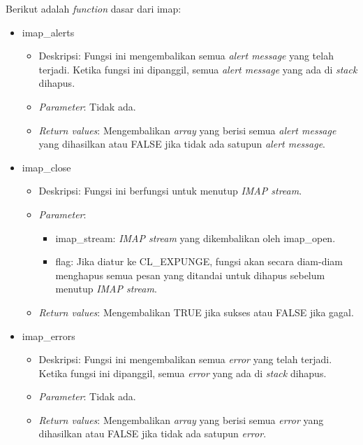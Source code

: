 Berikut adalah \textit{function} dasar dari imap:
\begin{itemize}
\item imap\_alerts
\begin{itemize}
\item Deskripsi: Fungsi ini mengembalikan semua \textit{alert message} yang telah terjadi. Ketika fungsi ini dipanggil, semua \textit{alert message} yang ada di \textit{stack} dihapus.
\item \textit{Parameter}: Tidak ada.
\item \textit{Return values}: Mengembalikan \textit{array} yang berisi semua \textit{alert message} yang dihasilkan atau FALSE jika tidak ada satupun \textit{alert message}.
\end{itemize}
 
\item imap\_close
\begin{itemize}
\item Deskripsi: Fungsi ini berfungsi untuk menutup \textit{IMAP stream}.
\item \textit{Parameter}:
\begin{itemize}
\item imap\_stream: \textit{IMAP stream} yang dikembalikan oleh imap\_open.
\item flag: Jika diatur ke CL\_EXPUNGE, fungsi akan secara diam-diam menghapus semua pesan yang ditandai untuk dihapus sebelum menutup \textit{IMAP stream}.
\end{itemize}
\item \textit{Return values}: Mengembalikan TRUE jika sukses atau FALSE jika gagal.
\end{itemize}
 
\item imap\_errors
\begin{itemize}
\item Deskripsi: Fungsi ini mengembalikan semua \textit{error} yang telah terjadi. Ketika fungsi ini dipanggil, semua \textit{error} yang ada di \textit{stack} dihapus.
\item \textit{Parameter}: Tidak ada.
\item \textit{Return values}: Mengembalikan \textit{array} yang berisi semua \textit{error} yang dihasilkan atau FALSE jika tidak ada satupun \textit{error}.
\end{itemize}
 

\end{itemize}

